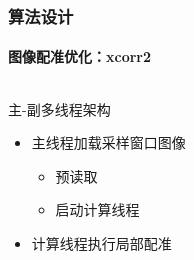 \documentclass{beamer}
\begin{document}
\begin{frame}
    \frametitle{算法设计}
    \framesubtitle{图像配准优化：xcorr2}

    \begin{columns}
        \begin{column}{0.5\textwidth}
            \begin{block}{主-副多线程架构}
            \begin{itemize}
                \item 主线程加载采样窗口图像
                \begin{itemize}
                    \item 预读取
                    \item 启动计算线程
                \end{itemize}
                \item 计算线程执行局部配准
            \end{itemize}
            \end{block}


\end{column}
\end{columns}
\end{frame}
\end{document}
